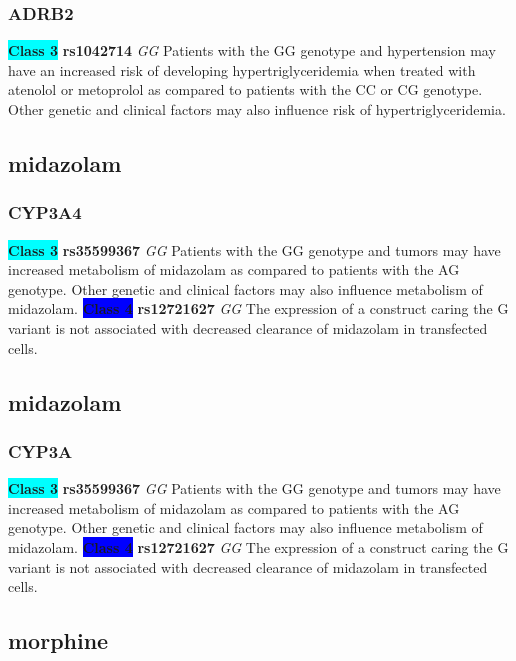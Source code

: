 \documentclass{book}
\begin{document}
\subsubsection{ ADRB2 }

\begin{center}
\textbf{\colorbox{cyan} {Class 3}} \textbf{ rs1042714 } \textit{ GG }
Patients with the GG genotype and hypertension may have an increased risk of developing hypertriglyceridemia when treated with atenolol or metoprolol as compared to patients with the CC or CG genotype. Other genetic and clinical factors may also influence risk of hypertriglyceridemia. 


\end{center}\subsection{ midazolam }


\subsubsection{ CYP3A4 }

\begin{center}
\textbf{\colorbox{cyan} {Class 3}} \textbf{ rs35599367 } \textit{ GG }
Patients with the GG genotype and tumors may have increased metabolism of midazolam as compared to patients with the AG genotype. Other genetic and clinical factors may also influence metabolism of midazolam. 
\textbf{\colorbox{blue} {Class 4}} \textbf{ rs12721627 } \textit{ GG }
The expression of a construct caring the G variant is not associated with decreased clearance of midazolam in transfected cells.

\end{center}\subsection{ midazolam }


\subsubsection{ CYP3A }

\begin{center}
\textbf{\colorbox{cyan} {Class 3}} \textbf{ rs35599367 } \textit{ GG }
Patients with the GG genotype and tumors may have increased metabolism of midazolam as compared to patients with the AG genotype. Other genetic and clinical factors may also influence metabolism of midazolam. 
\textbf{\colorbox{blue} {Class 4}} \textbf{ rs12721627 } \textit{ GG }
The expression of a construct caring the G variant is not associated with decreased clearance of midazolam in transfected cells.

\end{center}\subsection{ morphine }
\end{document}
